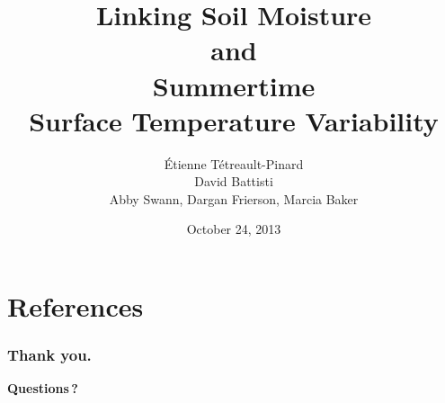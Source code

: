 \documentclass[10pt,xcolor=svgnames]{beamer}
\title[]%
{Linking Soil Moisture \\ {\Large and} \\ 
 Summertime \\ Surface Temperature Variability}
\author[]%
{\'Etienne T\'etreault-Pinard 
 \\[1em] {\small David Battisti}   
 \\ {\small Abby Swann, Dargan Frierson, Marcia Baker}   
}
\date[]%
{October 24, 2013}
\begin{document}
 
\mytitlepage












\section*{References}

\begin{frame}
\frametitle{Thank you.}

\vspace*{1cm}
\begin{minipage}{0.8\textwidth}

\nocite{fig2003}
\nocite{fig2010}
\nocite{fig2012}

{\tiny
\def\newblock{}


}

\vspace*{1cm}

\textbf{\large Questions\,?}

\end{minipage}

\end{frame}



%

\end{document}
